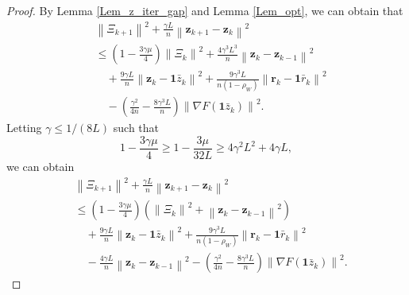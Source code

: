 \documentclass[10pt,a4paper]{amsart}
\begin{document}
\begin{proof}
By Lemma \ref{Lem_z_iter_gap} and Lemma \ref{Lem_opt}, we can obtain that
\begin{equation}
\begin{aligned}
&\left\| \varXi _{k+1} \right\| ^2+\frac{\gamma L}{n}\left\| \mathbf{z}_{k+1}-\mathbf{z}_k \right\| ^2
\\
&\leqslant \left( 1-\frac{3\gamma \mu}{4} \right) \left\| \varXi _k \right\| ^2+\frac{4\gamma ^3L^3}{n}\left\| \mathbf{z}_k-\mathbf{z}_{k-1} \right\| ^2
\\
&\quad +\frac{9\gamma L}{n}\left\| \mathbf{z}_k-\mathbf{1}\bar{z}_k \right\| ^2+\frac{9\gamma ^3L}{n\left( 1-\rho _W \right)}\left\| \mathbf{r}_k-\mathbf{1}\bar{r}_k \right\| ^2
\\
&\quad -\left( \frac{\gamma ^2}{4n}-\frac{8\gamma ^3L}{n} \right) \left\| \nabla F\left( \mathbf{1}\bar{z}_k \right) \right\| ^2.
\end{aligned}
\end{equation}
Letting $\gamma\leqslant 1/(8L)$ such that
\[
1-\frac{3\gamma \mu}{4}\geqslant 1-\frac{3\mu}{32L}\geqslant 4\gamma ^2L^2+4\gamma L,
\]
we can obtain 
\begin{equation}
\begin{aligned}
&\left\| \varXi _{k+1} \right\| ^2+\frac{\gamma L}{n}\left\| \mathbf{z}_{k+1}-\mathbf{z}_k \right\| ^2
\\
&\leqslant \left( 1-\frac{3\gamma \mu}{4} \right) \left( \left\| \varXi _k \right\| ^2+\left\| \mathbf{z}_k-\mathbf{z}_{k-1} \right\| ^2 \right) 
\\
&\quad+\frac{9\gamma L}{n}\left\| \mathbf{z}_k-\mathbf{1}\bar{z}_k \right\| ^2+\frac{9\gamma ^3L}{n\left( 1-\rho _W \right)}\left\| \mathbf{r}_k-\mathbf{1}\bar{r}_k \right\| ^2
\\
&\quad-\frac{4\gamma L}{n}\left\| \mathbf{z}_k-\mathbf{z}_{k-1} \right\| ^2-\left( \frac{\gamma ^2}{4n}-\frac{8\gamma ^3L}{n} \right) \left\| \nabla F\left( \mathbf{1}\bar{z}_k \right) \right\| ^2.
\end{aligned}
\end{equation}


\end{proof}
\end{document}
